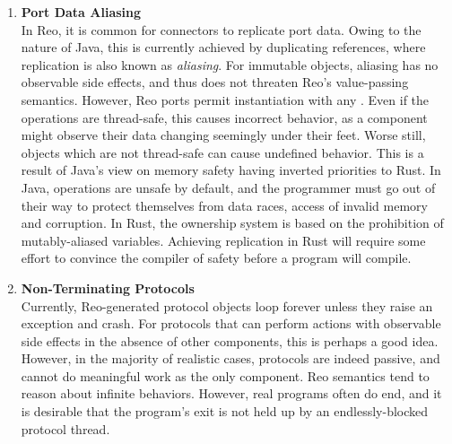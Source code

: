 \begin{enumerate}
	\item \textbf{Port Data Aliasing}\\
	In Reo, it is common for connectors to replicate port data. Owing to the nature of Java, this is currently achieved by duplicating references, where replication is also known as \textit{aliasing}. For immutable objects, aliasing has no observable side effects, and thus does not threaten Reo's value-passing semantics. However, Reo ports permit instantiation with any . Even if the operations are thread-safe, this causes incorrect behavior, as a component might observe their data changing seemingly under their feet. Worse still, objects which are not thread-safe can cause undefined behavior. This is a result of Java's view on memory safety having inverted priorities to Rust. In Java, operations are unsafe by default, and the programmer must go out of their way to protect themselves from data races, access of invalid memory and corruption. In Rust, the ownership system is based on the prohibition of mutably-aliased variables. Achieving replication in Rust will require some effort to convince the compiler of safety before a program will compile.
	
	\item \textbf{Non-Terminating Protocols}\\
	Currently, Reo-generated protocol objects loop forever unless they raise an exception and crash. For protocols that can perform actions with observable side effects in the absence of other components, this is perhaps a good idea. However, in the majority of realistic cases, protocols are indeed passive, and cannot do meaningful work as the only component. Reo semantics tend to reason about infinite behaviors. However, real programs often do end, and it is desirable that the program's exit is not held up by an endlessly-blocked protocol thread.
	

\end{enumerate}
